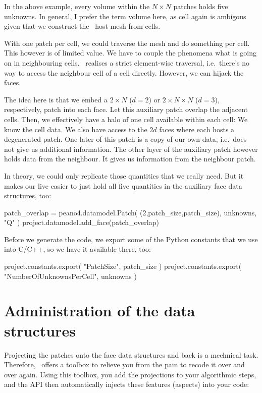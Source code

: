 \noindent
In the above example, every volume within the $N \times N$ patches holds five
unknowns.
In general, I prefer the term volume here, as cell again is ambigous given that
we construct the \Peano\ host mesh from cells.


With one patch per cell, we could traverse the mesh and do something per cell.
This however is of limited value.
We have to couple the phenomena what is going on in neighbouring cells.
\Peano\  realises a strict element-wise traversal, i.e.~there's no way to access
the neighbour cell of a cell directly.
However, we can hijack the faces.


The idea here is that we embed a $2 \times N$ ($d=2$) or $2 \times N \times N$
($d=3$), respectively, patch into each face. 
Let this auxiliary patch overlap the adjacent cells.
Then, we effectively have a halo of one cell available within each cell:
We know the cell data. 
We also have access to the $2d$ faces where each hosts a degenerated patch.
One later of this patch is a copy of our own data, i.e.~does not give us
additional information.
The other layer of the auxiliary patch however holds data from the neighbour.
It gives us information from the neighbour patch.


In theory, we could only replicate those quantities that we really need. 
But it makes our live easier to just hold all five quantities in the auxiliary
face data structures, too:

\begin{code}
patch_overlap = peano4.datamodel.Patch( (2,patch_size,patch_size), unknowns, "Q" )
project.datamodel.add_face(patch_overlap)
\end{code}


Before we generate the code, we export some of the Python constants that we use
into C/C++, so we have it available there, too:

\begin{code}
project.constants.export( "PatchSize", patch_size )
project.constants.export( "NumberOfUnknownsPerCell", unknowns )
\end{code}


\section{Administration of the data structures}

Projecting the patches onto the face data structures and back is a mechnical
task.
Therefore, \Peano\  offers a toolbox to relieve you from the pain to 
recode it over and over again.
Using this toolbox, you add the projections to your algorithmic steps, and the
API then automatically injects these features (aspects) into your code:

